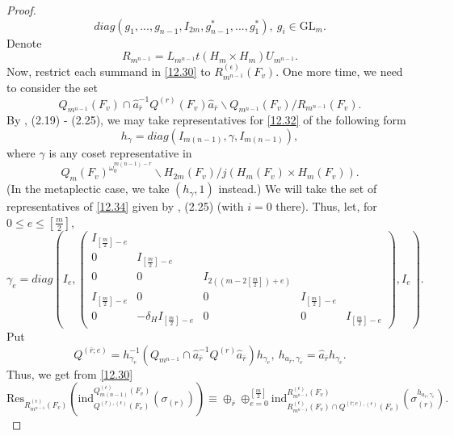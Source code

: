 \documentclass[12pts]{amsart}
\newcommand{\GL}{{\mathrm{GL}}}
\newcommand{\ind}{{\mathrm{ind}}}
\newcommand{\Res}{{\mathrm{Res}}}
\begin{document}
\begin{proof}
\begin{equation}\label{12.31.1}
diag(g_1,...,g_{n-1},I_{2m},g_{n-1}^*,...,g_1^*),\  g_i\in \GL_m.
\end{equation}
Denote
$$
R_{m^{n-1}}=L_{m^{n-1}}t(H_m\times H_m)U_{m^{n-1}}.
$$
Now, restrict each summand in \eqref{12.30} to $R^{(\epsilon)}_{m^{n-1}}(F_v)$. One more time, we need to consider the set
\begin{equation}\label{12.32}
Q_{m^{n-1}}(F_v)\cap \hat{a}_{\bar{r}}^{-1}Q^{(r)}(F_v)\hat{a}_{\bar{r}}\backslash Q_{m^{n-1}}(F_v)/ R_{m^{n-1}}(F_v).
\end{equation}
By \cite{GS18}, (2.19) - (2.25), we may take representatives for \eqref{12.32} of the following form
\begin{equation}\label{12.33}
h_\gamma=diag(I_{m(n-1)},\gamma,I_{m(n-1)}),
\end{equation}
where $\gamma$ is any coset representative in
\begin{equation}\label{12.34}
Q_m(F_v)^{\omega_0^{m(n-1)-r}}\backslash
H_{2m}(F_v)/j(H_m(F_v)\times H_m(F_v)). 
\end{equation}
(In the metaplectic case, we take $(h_\gamma,1)$ instead.) 
We will take the set of representatives of \eqref{12.34} given by \cite{GS18}, (2.25) (with $i=0$ there). Thus, let, for $0\leq e\leq [\frac{m}{2}]$,
\begin{equation}\label{12.35}
\gamma_e=diag(I_e,\begin{pmatrix}I_{[\frac{m}{2}]-e}\\0&I_{[\frac{m}{2}]-e}\\0&0&I_{2((m-2[\frac{m}{2}])+e)}\\
I_{[\frac{m}{2}]-e}&0&0&I_{[\frac{m}{2}]-e}\\0&-\delta_HI_{[\frac{m}{2}]-e}&0&0&I_{[\frac{m}{2}]-e}\end{pmatrix},I_e).
\end{equation}
Put 
$$
Q^{(\bar{r};e)}=h_{\gamma_e}^{-1}(Q_{m^{n-1}}\cap
\hat{a}_{\bar{r}}^{-1}Q^{(r)}\hat{a}_{\bar{r}})h_{\gamma_e},\ h_{a_{\bar{r}},\gamma_e}=\hat{a}_{\bar{r}}h_{\gamma_e}. 
$$
Thus, we get from \eqref{12.30}
\begin{equation}\label{12.36}
\Res_{R^{(\epsilon)}_{m^{n-1}}(F_v)}(\ind^{Q^{(\epsilon)}_{m(n-1)}(F_v)}_{Q^{(r),(\epsilon)}(F_v)}(\sigma_{(r)})) \equiv
\oplus_{\bar{r}}\oplus_{e=0}^{[\frac{m}{2}]}\ind^{R^{(\epsilon)}_{m^{n-1}}(F_v)}_{R^{(\epsilon)}_{m^{n-1}}(F_v)\cap Q^{(\bar{r};e),(\epsilon)}(F_v)}(\sigma_{(r)}^{h_{a_{\bar{r}},\gamma_e}}).
\end{equation}	

\end{proof}
\end{document}
